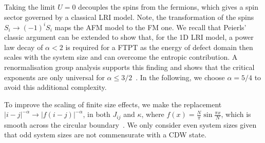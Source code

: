 Taking the limit \(U = 0\) decouples the spins from the fermions, which gives a spin sector governed by a classical LRI model. Note, the transformation of the spins \(S_i \to (-1)^{i} S_i\) maps the AFM model to the FM one. We recall that Peierls' classic argument can be extended to show that, for the 1D LRI model, a power law decay of \(\alpha < 2\) is required for a FTPT as the energy of defect domain then scales with the system size and can overcome the entropic contribution. A renormalisation group analysis supports this finding and shows that the critical exponents are only universal for \(\alpha \leq 3/2\)~\autocite{ruelleStatisticalMechanicsOnedimensional1968,thoulessLongRangeOrderOneDimensional1969,angeliniRelationsShortrangeLongrange2014}. In the following, we choose \(\alpha = 5/4\) to avoid this additional complexity.

To improve the scaling of finite size effects, we make the replacement \(|i - j|^{-\alpha} \rightarrow |f(i - j)|^{-\alpha}\), in both \(J_{ij}\) and \(\kappa\), where \(f(x) = \frac{N}{\pi}\sin \frac{\pi x}{N}\), which is smooth across the circular boundary~\autocite{fukuiOrderNClusterMonte2009}. We only consider even system sizes given that odd system sizes are not commensurate with a CDW state.

